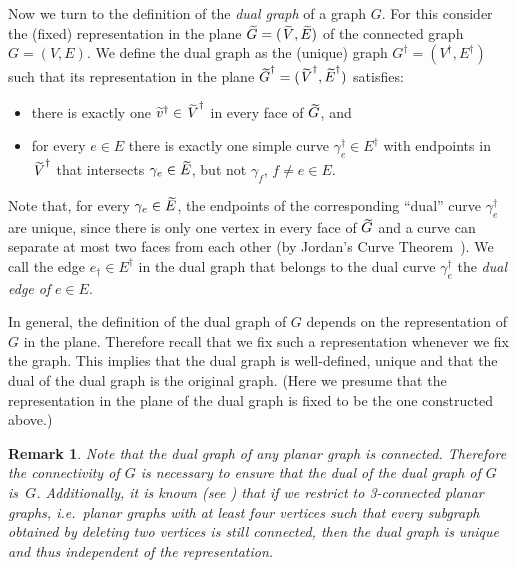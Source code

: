\documentclass{dis}
\newtheorem{remark}[theorem]{Remark}
\theoremstyle{citing}
\begin{document}
Now we turn to the definition of the 
\emph{dual graph} 
of a graph $G$. 
For this consider the (fixed) representation in the plane 
${\,\raisebox{2pt}{ ${\widetilde{{}}}$ }\mkern-15mu G}=({\,\raisebox{2pt}{ ${\widetilde{{}}}$ }\mkern-13mu V},{\,\raisebox{2pt}{ ${\widetilde{{}}}$ }\mkern-15mu E})$ 
of the connected graph $G=(V,E)$. We define the dual graph 
as the (unique) graph $G^\dag=(V^\dag, E^\dag)$ such that its 
representation in the plane ${\,\raisebox{2pt}{ ${\widetilde{{}}}$ }\mkern-15mu G}^\dag=({\,\raisebox{2pt}{ ${\widetilde{{}}}$ }\mkern-13mu V}^\dag, {\,\raisebox{2pt}{ ${\widetilde{{}}}$ }\mkern-15mu E}^\dag)$ 
satisfies: 
\begin{itemize}
	\item there is exactly one 
					${\widetilde{{v}}}^\dag\in{\,\raisebox{2pt}{ ${\widetilde{{}}}$ }\mkern-13mu V}^\dag$ in every face of ${\,\raisebox{2pt}{ ${\widetilde{{}}}$ }\mkern-15mu G}$, and
		\vspace{1mm}
	\item for every $e\in E$ there is exactly one simple curve 
					${\gamma}_e^\dag\in E^\dag$ with endpoints in ${\,\raisebox{2pt}{ ${\widetilde{{}}}$ }\mkern-13mu V}^\dag$ 
					that intersects ${\gamma}_e\in{\,\raisebox{2pt}{ ${\widetilde{{}}}$ }\mkern-15mu E}$, but not ${\gamma}_f$, $f\neq e\in E$.
\end{itemize}
Note that, for every ${\gamma}_e\in{\,\raisebox{2pt}{ ${\widetilde{{}}}$ }\mkern-15mu E}$, the endpoints of the 
corresponding ``dual'' curve ${\gamma}_e^\dag$ are unique, 
since there is only one vertex in every face of 
${\,\raisebox{2pt}{ ${\widetilde{{}}}$ }\mkern-15mu G}$ and a curve can separate at most two faces from each other 
(by Jordan's Curve Theorem~\cite{Mohar}).
We call the edge $e_\dag\in E^\dag$ in the dual graph that 
belongs to the dual curve ${\gamma}_e^\dag$ the 
\emph{dual edge of} 
$e\in E$.

In general, the definition of the dual graph of $G$ depends on the 
representation of $G$ in the plane. 
Therefore recall that we fix such a representation whenever we 
fix the graph. 
This implies 
that the dual graph is well-defined, unique and that 
the dual of the dual graph is the original graph. 
(Here we presume that the representation in the plane of the 
dual graph is fixed to be the one constructed above.)

\begin{remark}\label{remark:3-connected}
Note that the dual graph of any planar graph is connected.
Therefore the connectivity of $G$ is necessary to ensure 
that the dual of the dual graph of $G$ is~$G$.
Additionally, it is known (see \cite[Thm.~2.6.7]{Mohar}) that if we 
restrict to 3-connected planar graphs, i.e.~planar graphs 
with at least four vertices such that every subgraph obtained 
by deleting two vertices is still connected, then the dual 
graph is unique and thus independent of the representation. 
\end{remark}
\end{document}
